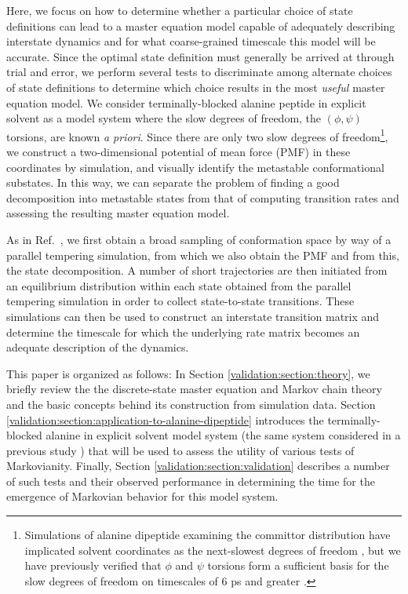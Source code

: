 Here, we focus on how to determine whether a particular choice of state definitions can lead to a master equation model capable of adequately describing interstate dynamics and for what coarse-grained timescale this model will be accurate.
Since the optimal state definition must generally be arrived at through trial and error, we perform several tests to discriminate among alternate choices of state definitions to determine which choice results in the most \emph{useful} master equation model.
We consider terminally-blocked alanine peptide in explicit solvent as a model system where the slow degrees of freedom, the $(\phi, \psi)$ torsions, are known \emph{a priori}.  
Since there are only two slow degrees of freedom\footnote{Simulations of alanine dipeptide examining the committor distribution have implicated solvent coordinates as the next-slowest degrees of freedom \cite{bolhuis:2000a,ma:2005a}, but we have previously verified that $\phi$ and $\psi$ torsions form a sufficient basis for the slow degrees of freedom on timescales of 6 ps and greater \cite{chodera:mms:2006}.}, we construct a two-dimensional potential of mean force (PMF) in these coordinates by simulation, and visually identify the metastable conformational substates.
In this way, we can separate the problem of finding a good decomposition into metastable states from that of computing transition rates and assessing the resulting master equation model.  

As in Ref.\ \cite{swope:2004a}, we first obtain a broad sampling of conformation space by way of a parallel tempering simulation, from which we also obtain the PMF and from this, the state decomposition.
A number of short trajectories are then initiated from an equilibrium distribution within each state obtained from the parallel tempering simulation in order to collect state-to-state transitions.  
These simulations can then be used to construct an interstate transition matrix and determine the timescale for which the underlying rate matrix becomes an adequate description of the dynamics.

This paper is organized as follows:
In Section \ref{validation:section:theory}, we briefly review the the discrete-state master equation and Markov chain theory and the basic concepts behind its construction from simulation data.  
Section \ref{validation:section:application-to-alanine-dipeptide} introduces the terminally-blocked alanine in explicit solvent model system (the same system considered in a previous study \cite{chodera:mms:2006}) that will be used to assess the utility of various tests of Markovianity.
Finally, Section \ref{validation:section:validation} describes a number of such tests and their observed performance in determining the time for the emergence of Markovian behavior for this model system.

